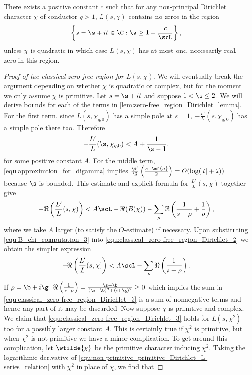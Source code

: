       \begin{theorem}
        There exists a positive constant $c$ such that for any non-principal Dirichlet character $\chi$ of conductor $q > 1$, $L(s,\chi)$ contains no zeros in the region
        \[
          \left\{s = \s+it \in \C:\s \ge 1-\frac{c}{\scL}\right\},
        \]
        unless $\chi$ is quadratic in which case $L(s,\chi)$ has at most one, necessarily real, zero in this region.
      \end{theorem}
      \begin{proof}[Proof of the classical zero-free region for $L(s,\chi)$]
        We will eventually break the argument depending on whether $\chi$ is quadratic or complex, but for the moment we only assume $\chi$ is primitive. Let $s = \s+it$ and suppose $1 < \s \le 2$. We will derive bounds for each of the terms in \cref{lem:zero-free_region_Dirichlet_lemma}. For the first term, since $L(s,\chi_{q,0})$ has a simple pole at $s = 1$, $-\frac{L'}{L}(s,\chi_{q,0})$ has a simple pole there too. Therefore
        \begin{equation}\label{equ:classical_zero-free_region_Dirichlet_1}
          -\frac{L'}{L}(\s,\chi_{q,0}) < A+\frac{1}{\s-1},
        \end{equation}
        for some positive constant $A$. For the middle term, \cref{equ:approximtion_for_digamma} implies $\frac{\G'}{\G}\left(\frac{s+\mf{a}}{2}\right) = O(\log(|t|+2))$ because $\s$ is bounded. This estimate and explicit formula for $\frac{L'}{L}(s,\chi)$ together give
        \begin{equation}\label{equ:classical_zero-free_region_Dirichlet_2}
          -\Re\left(\frac{L'}{L}(s,\chi)\right) < A\scL-\Re(B(\chi))-\sum_{\rho}\Re\left(\frac{1}{s-\rho}+\frac{1}{\rho}\right),
        \end{equation}
        where we take $A$ larger (to satisfy the $O$-estimate) if necessary. Upon substituting \cref{equ:B_chi_computation_3} into \cref{equ:classical_zero-free_region_Dirichlet_2} we obtain the simpler expression
        \begin{equation}\label{equ:classical_zero-free_region_Dirichlet_3}
          -\Re\left(\frac{L'}{L}(s,\chi)\right) < A\scL-\sum_{\rho}\Re\left(\frac{1}{s-\rho}\right).
        \end{equation}
        If $\rho = \b+i\g$, $\Re\left(\frac{1}{s-\rho}\right) = \frac{\s-\b}{(\s-\b)^{2}+(t+\g)^{2}} \ge 0$ which implies the sum in \cref{equ:classical_zero-free_region_Dirichlet_3} is a sum of nonnegative terms and hence any part of it may be discarded. Now suppose $\chi$ is primitive and complex. We claim that \cref{equ:classical_zero-free_region_Dirichlet_3} holds for $L(s,\chi^{2})$ too for a possibly larger constant $A$. This is certainly true if $\chi^{2}$ is primitive, but when $\chi^{2}$ is not primitive we have a minor complication. To get around this complication, let $\wtilde{\chi}$ be the primitive character inducing $\chi^{2}$. Taking the logarithmic derivative of \cref{equ:non-primitive_primitive_Dirichlet_L-series_relation} with $\chi^{2}$ in place of $\chi$, we find that

\end{proof}
